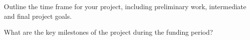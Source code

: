 Outline the time frame for your project, including preliminary work, intermediate and final project goals. 

What are the key milestones of the project during the funding period?






